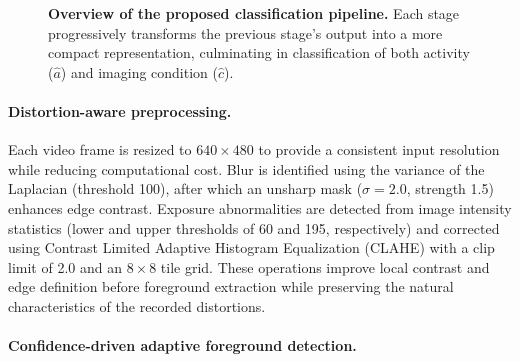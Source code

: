 \documentclass[runningheads]{llncs}
\begin{document}
\begin{figure}[htbp]
{%
}
\caption{\textbf{Overview of the proposed classification pipeline.}
Each stage progressively transforms the previous stage's output into a
more compact representation, culminating in classification of both
activity ($\hat{a}$) and imaging condition ($\hat{c}$).}
\label{fig:pipeline}
\end{figure}

\paragraph{Distortion-aware preprocessing.}

Each video frame is resized to $640\times480$ to provide a consistent 
input resolution while reducing computational cost. Blur is identified 
using the variance of the Laplacian (threshold 100), after which an 
unsharp mask ($\sigma=2.0$, strength 1.5) enhances edge contrast. 
Exposure abnormalities are detected from image intensity statistics 
(lower and upper thresholds of 60 and 195, respectively) and corrected 
using Contrast Limited Adaptive Histogram Equalization (CLAHE) with a 
clip limit of 2.0 and an $8\times8$ tile grid. These operations 
improve local contrast and edge definition before foreground 
extraction while preserving the natural characteristics of the 
recorded distortions.

\paragraph{Confidence-driven adaptive foreground detection.}
\end{document}
